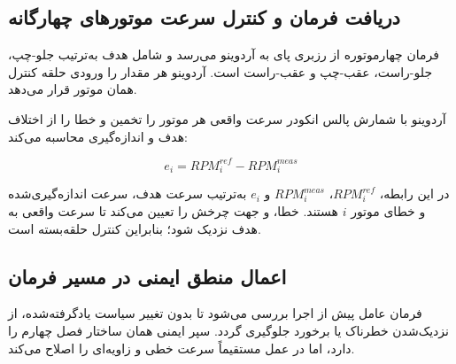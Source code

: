 \subsection{دریافت فرمان و کنترل سرعت موتورهای چهارگانه}
\label{subsec:real_motor_speed_control}

فرمان چهارموتوره از رزبری پای به آردوینو می‌رسد و شامل  هدف به‌ترتیب جلو-چپ، جلو-راست، عقب-چپ و عقب-راست است. آردوینو هر مقدار را ورودی حلقه کنترل همان موتور قرار می‌دهد.

آردوینو با شمارش پالس انکودر سرعت واقعی هر موتور را تخمین و خطا را از اختلاف هدف و اندازه‌گیری محاسبه می‌کند:

\begin{equation}
	e_i = RPM^{ref}_i - RPM^{meas}_i
	\label{eq:real_motor_rpm_error}
\end{equation}

در این رابطه، $RPM^{ref}_i$، $RPM^{meas}_i$ و $e_i$ به‌ترتیب سرعت هدف، سرعت اندازه‌گیری‌شده و خطای موتور $i$ هستند. خطا،  و جهت چرخش را تعیین می‌کند تا سرعت واقعی به هدف نزدیک شود؛ بنابراین کنترل حلقه‌بسته است.

\subsection{اعمال منطق ایمنی در مسیر فرمان}
\label{subsec:real_safety_logic_execution}

فرمان عامل پیش از اجرا بررسی می‌شود تا بدون تغییر سیاست یادگرفته‌شده، از نزدیک‌شدن خطرناک یا برخورد جلوگیری گردد. سپر ایمنی همان ساختار فصل چهارم را دارد، اما در عمل مستقیماً سرعت خطی و زاویه‌ای را اصلاح می‌کند.


